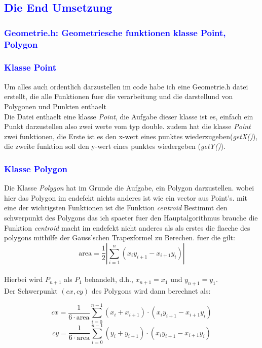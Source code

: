 \documentclass{article}
\begin{document}
\subsection{\textcolor{blue}{Die End Umsetzung}}
\subsubsection{\textcolor{blue}{Geometrie.h: Geometriesche funktionen klasse Point, Polygon}}
\subsubsection{\textcolor{blue}{Klasse Point}}
Um alles auch ordentlich darzustellen im code habe ich eine Geometrie.h datei erstellt, die alle Funktionen fuer die verarbeitung und die darstellund von Polygonen und Punkten enthaelt
\\
Die Datei enthaelt eine klasse \textit{Point}, die Aufgabe dieser klasse ist es, einfach ein Punkt darzustellen also zwei werte vom typ double. zudem hat die klasse \textit{Point} zwei funktionen, die Erste ist es den x-wert eines punktes wiederzugeben(\textit{getX()}), die zweite funktion soll den y-wert eines punktes wiedergeben (\textit{getY()}).  
\subsubsection{\textcolor{blue}{Klasse Polygon}}
Die Klasse \textit{Polygon} hat im Grunde die Aufgabe, ein Polygon darzustellen. wobei hier das Polygon im endefekt nichts anderes ist wie ein vector aus Point's. mit eine der wichtigsten Funktionen ist die Funktion \textit{centroid} Bestimmt den schwerpunkt des Polygons das ich spaeter fuer den Hauptalgorithmus brauche die Funktion \textit{centroid} macht im endefekt nicht anderes als als erstes die flaeche des polygons mithilfe der Gauss'schen Trapezformel zu Berechen. fuer die gilt:
\[
\text{area} = \frac{1}{2} \left| \sum_{i=1}^{n} (x_i y_{i+1} - x_{i+1} y_i) \right|
\]
\\
Hierbei wird $P_{n+1}$ als $P_1$ behandelt, d.h., $x_{n+1} = x_1$ und $y_{n+1} = y_1$.
\\
Der Schwerpunkt $(cx, cy)$ des Polygons wird dann berechnet als:

\[
cx = \frac{1}{6 \cdot \text{area}} \sum_{i=0}^{n-1} (x_i + x_{i+1}) \cdot (x_i y_{i+1} - x_{i+1} y_i)
\]
\[
cy = \frac{1}{6 \cdot \text{area}} \sum_{i=0}^{n-1} (y_i + y_{i+1}) \cdot (x_i y_{i+1} - x_{i+1} y_i)
\]
\end{document}
